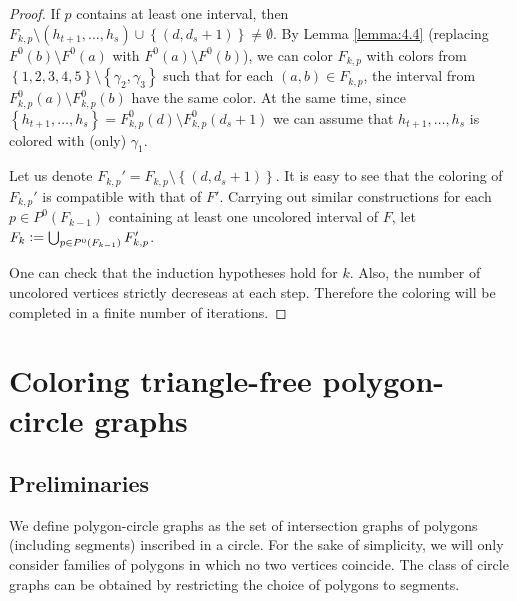 \documentclass[12pt]{article}
\theoremstyle{definition}
\newcommand{\defeq}{\vcentcolon=}
\begin{document}
\begin{proof}
        If $p$ contains at least one interval,
        then $F_{k, p} \setminus \left(h_{t+1},
        \ldots, h_{s}\right) \cup 
        \left\{\left(d, d_{s} + 1\right)\right\}
        \neq \emptyset$.
        By Lemma \ref{lemma:4.4}
        (replacing $F^{0}\left(b\right)
        \setminus F^{0}\left(a\right)$
        with $F^{0}\left(a\right)
        \setminus F^{0}\left(b\right)$),
        we can color $F_{k, p}$ 
        with colors from
        $\left\{1,2,3,4,5\right\} \setminus 
        \left\{\gamma_2, \gamma_3\right\}$
        such that
        for each
        $\left(a, b\right) \in 
        F_{k, p}$,
        the interval from
        $F^{0}_{k, p}\left(a\right) \setminus 
        F^{0}_{k, p}\left(b\right)$
        have the same color.
        At the same time,
        since $\left\{h_{t+1},
        \ldots, h_{s}\right\}
        = F^{0}_{k, p}\left(d\right)
        \setminus F^{0}_{k, p}\left(d_{s} + 1\right)$
        we can assume that 
        $h_{t+1}, \ldots,
        h_{s}$ is colored 
        with (only) $\gamma_1$.
        
        Let us denote $F_{k, p}' = 
        F_{k, p} \setminus \left\{
        \left(d, d_{s} + 1\right)\right\}$.
        It is easy to see that the coloring of
        $F_{k, p}'$ is compatible
        with that of
        $F'$.
        Carrying out similar constructions
        for each $p \in P^{0}\left(F_{k-1}\right)$
        containing at least one uncolored
        interval of $F$, let
        $F_{k} \defeq \bigcup_{p \in 
        P^{0}\left(F_{k-1}\right)} F_{k, p}'$.

        One can check that the 
        induction hypotheses hold
        for $k$.
        Also, the number of uncolored
        vertices strictly decreseas 
        at each step. Therefore
        the coloring will be 
        completed in a finite
        number of iterations.
    \end{proof}
    
    \section{Coloring triangle-free polygon-circle graphs}
    
    \subsection{Preliminaries}

    We define polygon-circle
    graphs as the set of intersection
    graphs of polygons
    (including segments)
    inscribed in a circle.
    For the sake of simplicity,
    we will only consider
    families of polygons
    in which no two
    vertices coincide.
    The class of circle
    graphs can be obtained
    by restricting the
    choice of polygons
    to segments.
\end{document}
